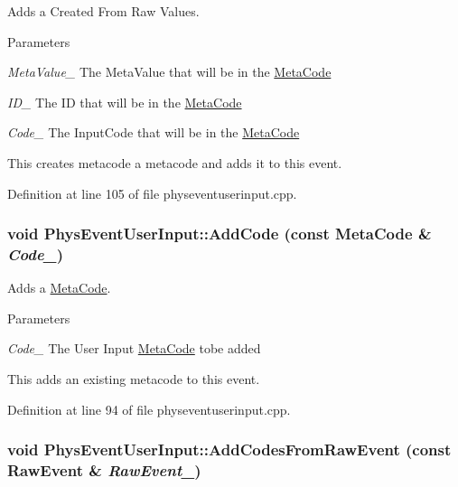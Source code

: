 Adds a Created From Raw Values. 
\begin{DoxyParams}{Parameters}
\item[{\em MetaValue\_\-}]The MetaValue that will be in the \hyperlink{classMetaCode}{MetaCode} \item[{\em ID\_\-}]The ID that will be in the \hyperlink{classMetaCode}{MetaCode} \item[{\em Code\_\-}]The InputCode that will be in the \hyperlink{classMetaCode}{MetaCode}\end{DoxyParams}
This creates metacode a metacode and adds it to this event. 

Definition at line 105 of file physeventuserinput.cpp.\hypertarget{classPhysEventUserInput_a4f5b94c64cd08c15b480e441d25a385d}{
\subsubsection[{AddCode}]{\setlength{\rightskip}{0pt plus 5cm}void PhysEventUserInput::AddCode (const {\bf MetaCode} \& {\em Code\_\-})}}
\label{dc/d0e/classPhysEventUserInput_a4f5b94c64cd08c15b480e441d25a385d}


Adds a \hyperlink{classMetaCode}{MetaCode}. 
\begin{DoxyParams}{Parameters}
\item[{\em Code\_\-}]The User Input \hyperlink{classMetaCode}{MetaCode} tobe added\end{DoxyParams}
This adds an existing metacode to this event. 

Definition at line 94 of file physeventuserinput.cpp.\hypertarget{classPhysEventUserInput_a9e42f42f9a4a42f792e5cf95856669c0}{
\subsubsection[{AddCodesFromRawEvent}]{\setlength{\rightskip}{0pt plus 5cm}void PhysEventUserInput::AddCodesFromRawEvent (const RawEvent \& {\em RawEvent\_\-})}}
\label{dc/d0e/classPhysEventUserInput_a9e42f42f9a4a42f792e5cf95856669c0}


